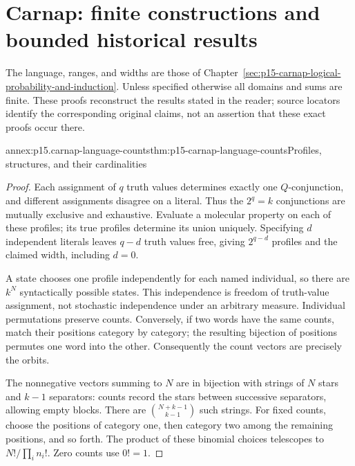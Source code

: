 \section{Carnap: finite constructions and bounded historical results}
\label{sec:annex-p15-carnap-logical-probability-and-induction}

The language, ranges, and widths are those of
Chapter~\ref{sec:p15-carnap-logical-probability-and-induction}. Unless
specified otherwise all domains and sums are finite. These proofs
reconstruct the results stated in the reader; source locators identify
the corresponding original claims, not an assertion that these exact
proofs occur there.

\begin{annexitem}{annex:p15.carnap-language-counts}{thm:p15-carnap-language-counts}{Profiles, structures, and their cardinalities}
\begin{proof}
Each assignment of \(q\) truth values determines exactly one
\(Q\)-conjunction, and different assignments disagree on a literal.
Thus the \(2^q=k\) conjunctions are mutually exclusive and exhaustive.
Evaluate a molecular property on each of these profiles; its true
profiles determine its union uniquely. Specifying \(d\) independent
literals leaves \(q-d\) truth values free, giving \(2^{q-d}\)
profiles and the claimed width, including \(d=0\).

A state chooses one profile independently for each named individual,
so there are \(k^N\) syntactically possible states. This independence
is freedom of truth-value assignment, not stochastic independence under
an arbitrary measure. Individual permutations preserve counts. Conversely,
if two words have the same counts, match their positions category by
category; the resulting bijection of positions permutes one word into
the other. Consequently the count vectors are precisely the orbits.

The nonnegative vectors summing to \(N\) are in bijection with strings
of \(N\) stars and \(k-1\) separators: counts record the stars
between successive separators, allowing empty blocks. There are
\(\binom{N+k-1}{k-1}\) such strings. For fixed counts, choose the
positions of category one, then category two among the remaining
positions, and so forth. The product of these binomial choices telescopes
to \(N!/\prod_i n_i!\). Zero counts use \(0!=1\).
\end{proof}
\end{annexitem}

